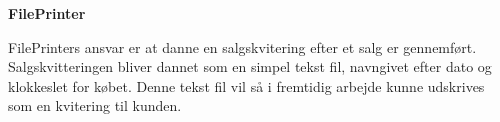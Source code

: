 \textbf{FilePrinter}

FilePrinters ansvar er at danne en salgskvitering efter et salg er gennemført. Salgskvitteringen bliver dannet som en simpel tekst fil, navngivet efter dato og klokkeslet for købet. Denne tekst fil vil så i fremtidig arbejde kunne udskrives som en kvitering til kunden. 

\bigskip